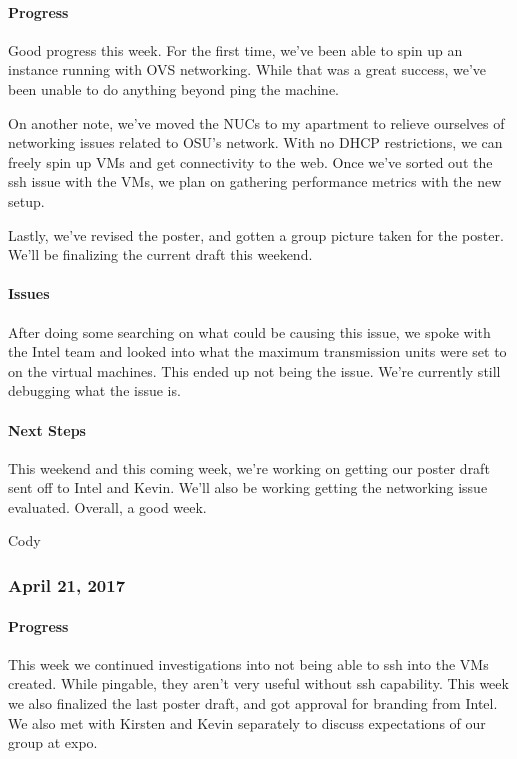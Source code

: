 \documentclass[10pt,onecolumn,journal,draftclsnofoot]{IEEEtran}
\begin{document}
\paragraph{Progress} 

Good progress this week. For the first time, we've been able to spin up
an instance running with OVS networking. While that was a great success,
we've been unable to do anything beyond ping the machine.

On another note, we've moved the NUCs to my apartment to relieve
ourselves of networking issues related to OSU's network. With no DHCP
restrictions, we can freely spin up VMs and get connectivity to the web.
Once we've sorted out the ssh issue with the VMs, we plan on gathering
performance metrics with the new setup.

Lastly, we've revised the poster, and gotten a group picture taken for
the poster. We'll be finalizing the current draft this weekend.

\paragraph{Issues} 

After doing some searching on what could be causing this issue, we spoke
with the Intel team and looked into what the maximum transmission units
were set to on the virtual machines. This ended up not being the issue.
We're currently still debugging what the issue is.

\paragraph{Next Steps} 

This weekend and this coming week, we're working on getting our poster
draft sent off to Intel and Kevin. We'll also be working getting the
networking issue evaluated. Overall, a good week.

Cody

\subsubsection{April 21, 2017} 

\paragraph{Progress} 

This week we continued investigations into not being able to ssh into
the VMs created. While pingable, they aren't very useful without ssh
capability. This week we also finalized the last poster draft, and got
approval for branding from Intel. We also met with Kirsten and Kevin
separately to discuss expectations of our group at expo.
\end{document}
